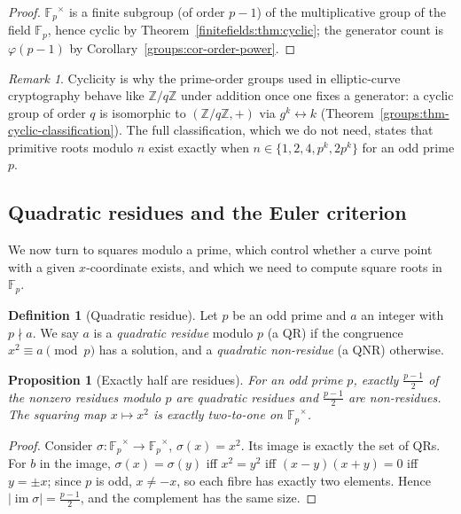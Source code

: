 \documentclass[11pt,a4paper]{article}
\newtheorem{proposition}[theorem]{Proposition}
\theoremstyle{definition}
\newtheorem{definition}[theorem]{Definition}
\theoremstyle{remark}
\newtheorem{remark}[theorem]{Remark}
\newcommand{\Z}{\ensuremath{\mathbb{Z}}}
\newcommand{\Fp}{\ensuremath{\mathbb{F}_{p}}}
\DeclareMathOperator{\img}{im}
\begin{document}
\begin{proof}
\(\Fp^\times\) is a finite subgroup (of order \(p-1\)) of the multiplicative group of the field \(\Fp\), hence cyclic by Theorem~\ref{finitefields:thm:cyclic}; the generator count is \(\varphi(p-1)\) by Corollary~\ref{groups:cor-order-power}.
\end{proof}

\begin{remark}\label{numbertheory:rem:cyclic-subgroup}
Cyclicity is why the prime-order groups used in elliptic-curve cryptography behave like \(\Z/q\Z\) under addition once one fixes a generator: a cyclic group of order \(q\) is isomorphic to \((\Z/q\Z, +)\) via \(g^k \leftrightarrow k\) (Theorem~\ref{groups:thm-cyclic-classification}). The full classification, which we do not need, states that primitive roots modulo \(n\) exist exactly when \(n \in \{1,2,4,p^k,2p^k\}\) for an odd prime \(p\).
\end{remark}

\subsection{Quadratic residues and the Euler criterion}\label{numbertheory:subsec:qr}

We now turn to squares modulo a prime, which control whether a curve point with a given \(x\)-coordinate exists, and which we need to compute square roots in \(\Fp\).

\begin{definition}[Quadratic residue]\label{numbertheory:def:qr}
Let \(p\) be an odd prime and \(a\) an integer with \(p \nmid a\). We say \(a\) is a \emph{quadratic residue} modulo \(p\) (a QR) if the congruence \(x^2 \equiv a \pmod p\) has a solution, and a \emph{quadratic non-residue} (a QNR) otherwise.
\end{definition}

\begin{proposition}[Exactly half are residues]\label{numbertheory:prop:half-qr}
For an odd prime \(p\), exactly \(\tfrac{p-1}{2}\) of the nonzero residues modulo \(p\) are quadratic residues and \(\tfrac{p-1}{2}\) are non-residues. The squaring map \(x \mapsto x^2\) is exactly two-to-one on \(\Fp^\times\).
\end{proposition}

\begin{proof}
Consider \(\sigma : \Fp^\times \to \Fp^\times\), \(\sigma(x)=x^2\). Its image is exactly the set of QRs. For \(b\) in the image, \(\sigma(x)=\sigma(y)\) iff \(x^2=y^2\) iff \((x-y)(x+y)=0\) iff \(y = \pm x\); since \(p\) is odd, \(x \ne -x\), so each fibre has exactly two elements. Hence \(\lvert \img \sigma\rvert = \tfrac{p-1}{2}\), and the complement has the same size.
\end{proof}
\end{document}
